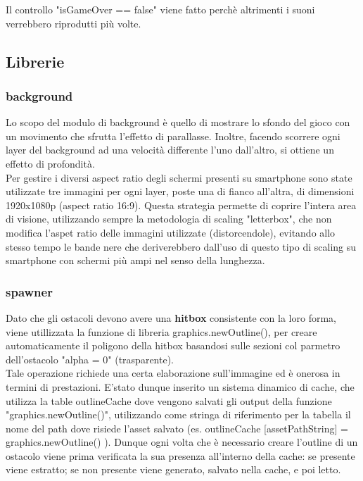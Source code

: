 \documentclass[12pt]{article}
\begin{document}
Il controllo "isGameOver == false" viene fatto perchè altrimenti i suoni verrebbero riprodutti più volte.

\subsection{Librerie}
\subsubsection{background}
Lo scopo del modulo di background è quello di mostrare lo sfondo del gioco con un movimento che sfrutta l'effetto di parallasse. Inoltre, facendo scorrere ogni layer del background ad una velocità differente l'uno dall'altro, si ottiene un effetto di profondità.\\

Per gestire i diversi aspect ratio degli schermi presenti su smartphone sono state utilizzate tre immagini per ogni layer, poste una di fianco all'altra, di dimensioni 1920x1080p (aspect ratio 16:9). Questa strategia permette di coprire l'intera area di visione, utilizzando sempre la metodologia di scaling "letterbox", che non modifica l'aspet ratio delle immagini utilizzate (distorcendole), evitando allo stesso tempo le bande nere che deriverebbero dall'uso di questo tipo di scaling su smartphone con schermi più ampi nel senso della lunghezza.

\subsubsection{spawner}

Dato che gli ostacoli devono avere una \textbf{hitbox} consistente con la loro forma, viene utillizzata la funzione di libreria 
graphics.newOutline(), per creare automaticamente il poligono della hitbox basandosi sulle sezioni col parmetro dell'ostacolo "alpha = 0" (trasparente).
\\

Tale operazione richiede una certa elaborazione sull’immagine ed è onerosa in termini di prestazioni. E'stato dunque inserito un sistema 
dinamico di cache, che utilizza la table outlineCache dove vengono salvati gli output della funzione "graphics.newOutline()", utilizzando come stringa di riferimento per la tabella il nome del path dove risiede l’asset salvato (es. outlineCache [assetPathString] = graphics.newOutline() ).
Dunque ogni volta che è necessario creare l’outline di un ostacolo viene prima verificata la sua presenza all'interno della cache: se presente viene
estratto; se non presente viene generato, salvato nella cache, e poi letto.
\\
\end{document}
